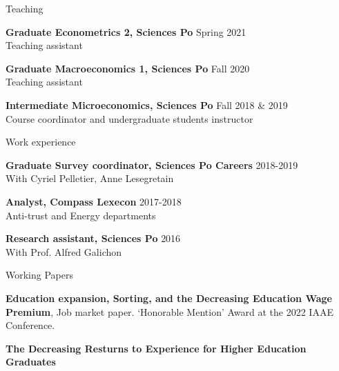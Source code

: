 \documentclass{resume} %
\begin{document}

\begin{rSection}{Teaching}

{\bf Graduate Econometrics 2, Sciences Po} \hfill {Spring 2021}
  \\ Teaching assistant

{\bf Graduate Macroeconomics 1, Sciences Po} \hfill {Fall 2020}
  \\ Teaching assistant


{\bf Intermediate Microeconomics, Sciences Po} \hfill {Fall 2018 \& 2019}
\\ Course coordinator and undergraduate students instructor

\end{rSection}


\begin{rSection}{Work experience}

  {\bf Graduate Survey coordinator, Sciences Po Careers} \hfill {2018-2019} \\
  With Cyriel Pelletier, Anne Lesegretain

{\bf Analyst, Compass Lexecon} \hfill {2017-2018}
\\ Anti-trust and Energy departments

{\bf Research assistant, Sciences Po} \hfill {2016}
\\ With Prof. Alfred Galichon

\end{rSection}


\begin{rSection}{Working Papers}

  {\bf Education expansion, Sorting, and the Decreasing Education Wage Premium}, Job market paper. ‘Honorable Mention' Award at the 2022 IAAE Conference.
  
  {\bf The Decreasing Resturns to Experience for Higher Education Graduates}
  
  \end{rSection}
\end{document}
